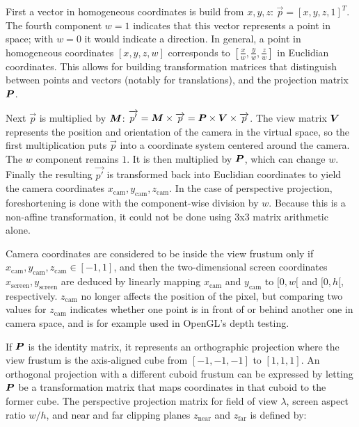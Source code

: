 \documentclass[a4paper,10pt,abstracton,notitlepage]{scrreprt}
\begin{document}
First a vector in homogeneous coordinates is build from $x, y, z$: $\overrightarrow{p} = [x, y, z, 1]^{T}$. The fourth component $w = 1$ indicates that this vector represents a point in space; with $w = 0$ it would indicate a direction. In general, a point in homogeneous coordinates $[x, y, z, w]$ corresponds to $[\frac{x}{w}, \frac{y}{w}, \frac{z}{w}]$ in Euclidian coordinates. This allows for building transformation matrices that distinguish between points and vectors (notably for translations), and the projection matrix $\matrixsym{P}$.

Next $\overrightarrow{p}$ is multiplied by $\matrixsym{M}$: $\overrightarrow{p'} = \matrixsym{M} \times \overrightarrow{p} = \matrixsym{P} \times \matrixsym{V} \times \overrightarrow{p}$. The view matrix $\matrixsym{V}$ represents the position and orientation of the camera in the virtual space, so the first multiplication puts $\overrightarrow{p}$ into a coordinate system centered around the camera. The $w$ component remains $1$. It is then multiplied by $\matrixsym{P}$, which can change $w$. Finally the resulting $\overrightarrow{p'}$ is transformed back into Euclidian coordinates to yield the camera coordinates $x_{\mathrm{cam}}, y_{\mathrm{cam}}, z_{\mathrm{cam}}$. In the case of perspective projection, foreshortening is done with the component-wise division by $w$. Because this is a non-affine transformation, it could not be done using 3x3 matrix arithmetic alone.

Camera coordinates are considered to be inside the view frustum only if $x_{\mathrm{cam}}, y_{\mathrm{cam}}, z_{\mathrm{cam}} \in [-1, 1]$, and then the two-dimensional screen coordinates $x_{\mathrm{screen}}, y_{\mathrm{screen}}$ are deduced by linearly mapping $x_{\mathrm{cam}}$ and $y_{\mathrm{cam}}$ to $[0, w[$ and $[0, h[$, respectively. $z_{\mathrm{cam}}$ no longer affects the position of the pixel, but comparing two values for $z_{\mathrm{cam}}$ indicates whether one point is in front of or behind another one in camera space, and is for example used in OpenGL's depth testing.

If $\matrixsym{P}$ is the identity matrix, it represents an orthographic projection where the view frustum is the axis-aligned cube from $[-1, -1, -1]$ to $[1, 1, 1]$. An orthogonal projection with a different cuboid frustum can be expressed by letting $\matrixsym{P}$ be a transformation matrix that maps coordinates in that cuboid to the former cube. The perspective projection matrix for field of view $\lambda$, screen aspect ratio $w/h$, and near and far clipping planes $z_{\mathrm{near}}$ and $z_{\mathrm{far}}$ is defined by:
\end{document}
